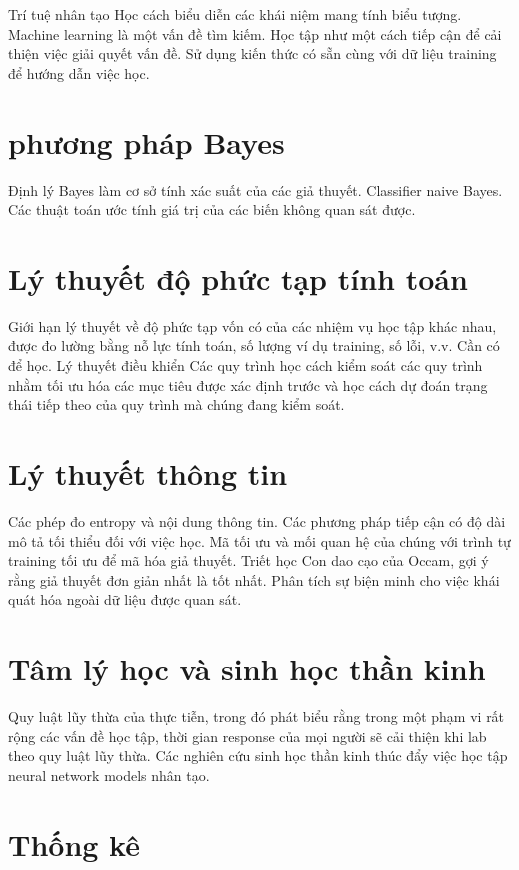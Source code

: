 Trí tuệ nhân tạo Học cách biểu diễn các khái niệm mang tính biểu tượng. Machine learning là một vấn đề tìm kiếm. Học tập như một cách tiếp cận để cải thiện việc giải quyết vấn đề. Sử dụng kiến ​​thức có sẵn cùng với dữ liệu training để hướng dẫn việc học.

\section{phương pháp Bayes}

Định lý Bayes làm cơ sở tính xác suất của các giả thuyết. Classifier naive Bayes. Các thuật toán ước tính giá trị của các biến không quan sát được.

\section{Lý thuyết độ phức tạp tính toán}

Giới hạn lý thuyết về độ phức tạp vốn có của các nhiệm vụ học tập khác nhau, được đo lường bằng nỗ lực tính toán, số lượng ví dụ training, số lỗi, v.v. Cần có để học. Lý thuyết điều khiển Các quy trình học cách kiểm soát các quy trình nhằm tối ưu hóa các mục tiêu được xác định trước và học cách dự đoán trạng thái tiếp theo của quy trình mà chúng đang kiểm soát.

\section{Lý thuyết thông tin}

Các phép đo entropy và nội dung thông tin. Các phương pháp tiếp cận có độ dài mô tả tối thiểu đối với việc học. Mã tối ưu và mối quan hệ của chúng với trình tự training tối ưu để mã hóa giả thuyết. Triết học Con dao cạo của Occam, gợi ý rằng giả thuyết đơn giản nhất là tốt nhất. Phân tích sự biện minh cho việc khái quát hóa ngoài dữ liệu được quan sát.

\section{Tâm lý học và sinh học thần kinh}

Quy luật lũy thừa của thực tiễn, trong đó phát biểu rằng trong một phạm vi rất rộng các vấn đề học tập, thời gian response của mọi người sẽ cải thiện khi lab theo quy luật lũy thừa. Các nghiên cứu sinh học thần kinh thúc đẩy việc học tập neural network models nhân tạo.

\section{Thống kê}

